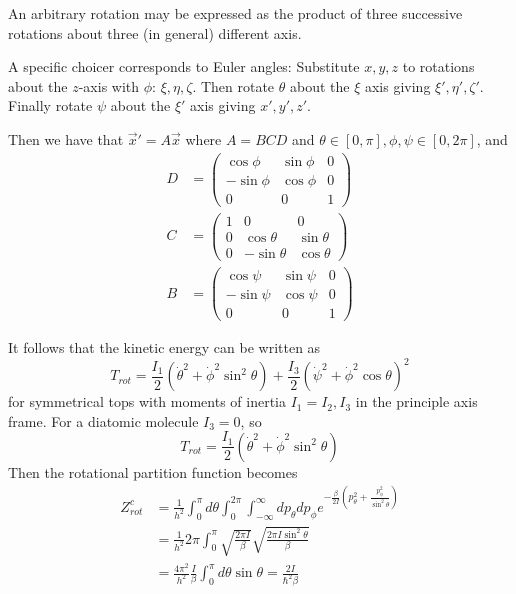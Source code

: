 \documentclass[12pt, a4paper, oneside, openright, titlepage]{book}
\begin{document}
\begin{prop}
    An arbitrary rotation may be expressed as the product of three successive rotations about three (in general) different axis.
\end{prop}

A specific choicer corresponds to Euler angles: Substitute $x,y,z$ to rotations about the $z$-axis with $\phi$: $\xi,\eta,\zeta$. Then rotate $\theta$ about the $\xi$ axis giving $\xi',\eta',\zeta'$. Finally rotate $\psi$ about the $\xi'$ axis giving $x',y',z'$.

Then we have that $\vec{x}' = A\vec{x}$ where $A = BCD$ and $\theta \in [0,\pi],\phi,\psi\in[0,2\pi]$, and \begin{align*}
    D &= \begin{pmatrix} \cos\phi & \sin\phi & 0 \\ -\sin\phi & \cos\phi & 0 \\ 0 & 0 & 1 \end{pmatrix} \\
    C &= \begin{pmatrix} 1 & 0 & 0 \\ 0 & \cos\theta & \sin\theta \\ 0 & -\sin\theta & \cos\theta \end{pmatrix} \\
    B &= \begin{pmatrix} \cos\psi & \sin\psi & 0 \\ -\sin\psi & \cos\psi & 0 \\ 0 & 0 & 1 \end{pmatrix}
\end{align*}

It follows that the kinetic energy can be written as \begin{equation*}
    T_{rot} = \frac{I_1}{2}(\dot{\theta}^2+\dot{\phi}^2\sin^2\theta)+\frac{I_3}{2}(\dot{\psi}^2+\dot{\phi}^2\cos\theta)^2
\end{equation*}
for symmetrical tops with moments of inertia $I_1 = I_2, I_3$ in the principle axis frame. For a diatomic molecule $I_3 = 0$, so \begin{equation*}
    T_{rot} = \frac{I_1}{2}(\dot{\theta}^2+\dot{\phi}^2\sin^2\theta)
\end{equation*}
Then the rotational partition function becomes \begin{align*}
    Z_{rot}^c &= \frac{1}{h^2}\int_0^{\pi}d\theta\int_0^{2\pi}\int_{-\infty}^{\infty}dp_{\theta}dp_{\phi}e^{-\frac{\beta}{2I}\left(p_{\theta}^2+\frac{p_{\phi}^2}{\sin^2\theta}\right)} \\
    &= \frac{1}{h^2}2\pi\int_0^{\pi}\sqrt{\frac{2\pi I}{\beta}}\sqrt{\frac{2\pi I\sin^2\theta}{\beta}} \\
    &= \frac{4\pi^2}{h^2}\frac{I}{\beta}\int_0^{\pi}d\theta\sin\theta = \frac{2I}{\hbar^2\beta}
\end{align*}
\end{document}
